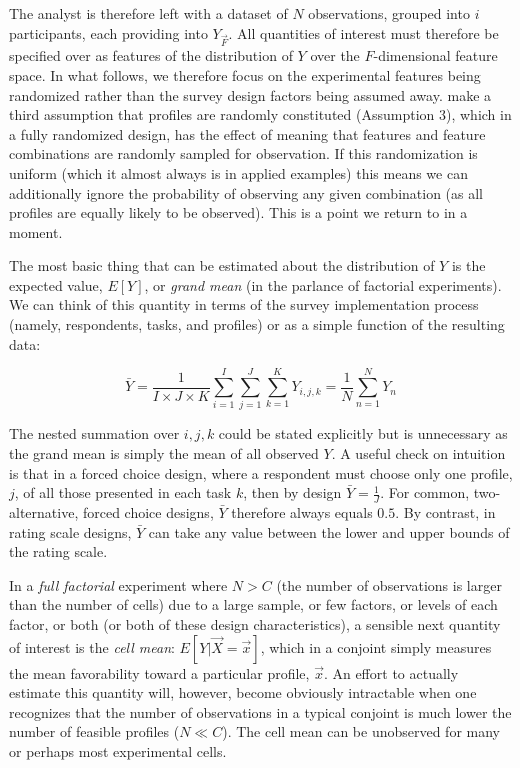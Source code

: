 \documentclass[a4paper,12pt]{article}\usepackage[]{graphicx}\usepackage[]{color}
\begin{document}
The analyst is therefore left with a dataset of $N$ observations, grouped into $i$ participants, each providing into $Y_{\vec{F}}$. All quantities of interest must therefore be specified over as features of the distribution of $Y$ over the $F$-dimensional feature space. In what follows, we therefore focus on the experimental features being randomized rather than the survey design factors being assumed away. \citet{HainmuellerHopkinsYamamoto2014} make a third assumption that profiles are randomly constituted (Assumption 3), which in a fully randomized design, has the effect of meaning that features and feature combinations are randomly sampled for observation. If this randomization is uniform (which it almost always is in applied examples) this means we can additionally ignore the probability of observing any given combination (as all profiles are equally likely to be observed). This is a point we return to in a moment.

The most basic thing that can be estimated about the distribution of $Y$ is the expected value, $E[Y]$, or \textit{grand mean} (in the parlance of factorial experiments). We can think of this quantity in terms of the survey implementation process (namely, respondents, tasks, and profiles) or as a simple function of the resulting data:

\begin{equation}
\bar{Y} = \dfrac{1}{I \times J \times K} \sum_{i=1}^{I} \sum_{j=1}^{J} \sum_{k=1}^{K} Y_{i,j,k} = \dfrac{1}{N} \sum_{n=1}^{N} Y_n
\end{equation}

\noindent The nested summation over $i,j,k$ could be stated explicitly but is unnecessary as the grand mean is simply the mean of all observed $Y$. A useful check on intuition is that in a forced choice design, where a respondent must choose only one profile, $j$, of all those presented in each task $k$, then by design $\bar{Y} = \frac{1}{J}$. For common, two-alternative, forced choice designs, $\bar{Y}$ therefore always equals $0.5$. By contrast, in rating scale designs, $\bar{Y}$ can take any value between the lower and upper bounds of the rating scale.

In a \textit{full factorial} experiment where $N > C$ (the number of observations is larger than the number of cells) due to a large sample, or few factors, or levels of each factor, or both (or both of these design characteristics), a sensible next quantity of interest is the \textit{cell mean}: $E[Y|\vec{X} = \vec{x}]$, which in a conjoint simply measures the mean favorability toward a particular profile, $\vec{x}$. An effort to actually estimate this quantity will, however, become obviously intractable when one recognizes that the number of observations in a typical conjoint is much lower the number of feasible profiles ($N \ll C$). The cell mean can be unobserved for many or perhaps most experimental cells. 
\end{document}

